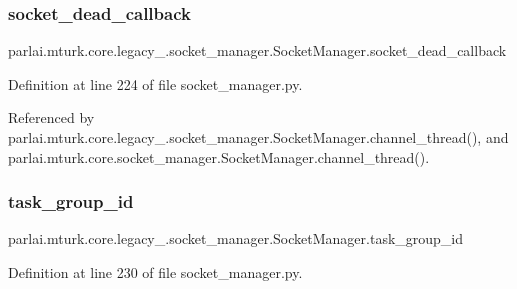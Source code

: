 \subsubsection{\texorpdfstring{socket\+\_\+dead\+\_\+callback}{socket\_dead\_callback}}
{\footnotesize\ttfamily parlai.\+mturk.\+core.\+legacy\+\_.\+socket\+\_\+manager.\+Socket\+Manager.\+socket\+\_\+dead\+\_\+callback}



Definition at line 224 of file socket\+\_\+manager.\+py.



Referenced by parlai.\+mturk.\+core.\+legacy\+\_.\+socket\+\_\+manager.\+Socket\+Manager.\+channel\+\_\+thread(), and parlai.\+mturk.\+core.\+socket\+\_\+manager.\+Socket\+Manager.\+channel\+\_\+thread().

\mbox{\label{classparlai_1_1mturk_1_1core_1_1legacy__2018_1_1socket__manager_1_1SocketManager_a7766f5aafcb9e27c5043a141e247b770}} 
\subsubsection{\texorpdfstring{task\+\_\+group\+\_\+id}{task\_group\_id}}
{\footnotesize\ttfamily parlai.\+mturk.\+core.\+legacy\+\_.\+socket\+\_\+manager.\+Socket\+Manager.\+task\+\_\+group\+\_\+id}



Definition at line 230 of file socket\+\_\+manager.\+py.



